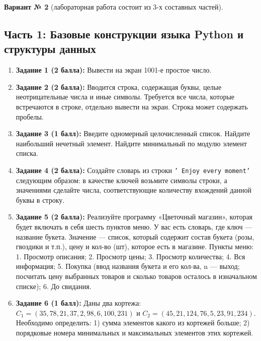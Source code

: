 \documentclass[14pt,a4paper]{extarticle}
\begin{document}
\textbf{Вариант № 2} (лабораторная работа состоит из 3-х составных частей).

\subsection{Часть 1: Базовые конструкции языка Python и структуры данных}
\begin{enumerate}
    \item \textbf{Задание 1 (2 балла):} Вывести на экран 1001-е простое число.
    \item \textbf{Задание 2 (2 балла):} Вводится строка, содержащая буквы, целые неотрицательные числа и иные символы. Требуется все числа, которые встречаются в строке, отдельно вывести на экран. Строка может содержать пробелы.
    \item \textbf{Задание 3 (1 балл):} Введите одномерный целочисленный список. Найдите наибольший нечетный элемент. Найдите минимальный по модулю элемент списка.
    \item \textbf{Задание 4 (2 балла):} Создайте словарь из строки \texttt{' Enjoy every moment'} следующим образом: в качестве ключей возьмите символы строки, а значениями сделайте числа, соответствующие количеству вхождений данной буквы в строку.
    \item \textbf{Задание 5 (2 балла):} Реализуйте программу «Цветочный магазин», которая будет включать в себя шесть пунктов меню. У вас есть словарь, где ключ --- название букета. Значение --- список, который содержит состав букета (розы, гвоздики и т.п.), цену и кол-во (шт), которое есть в магазине. Пункты меню: 1. Просмотр описания; 2. Просмотр цены; 3. Просмотр количества; 4. Вся информация; 5. Покупка (ввод названия букета и его кол-ва, n --- выход; посчитать цену выбранных товаров и сколько товаров осталось в изначальном списке); 6. До свидания.
    \item \textbf{Задание 6 (1 балл):} Даны два кортежа: $C_1 = (35, 78, 21, 37, 2, 98, 6, 100, 231)$ и $C_2 = (45, 21, 124, 76, 5, 23, 91, 234)$. Необходимо определить: 1) сумма элементов какого из кортежей больше; 2) порядковые номера минимальных и максимальных элементов этих кортежей.
\end{enumerate}
\end{document}
